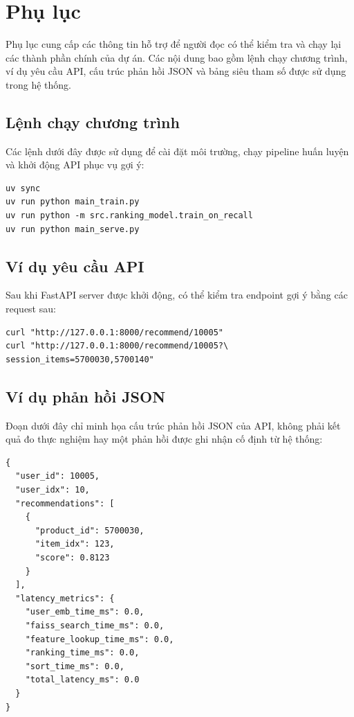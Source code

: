 \chapter{Phụ lục}

Phụ lục cung cấp các thông tin hỗ trợ để người đọc có thể kiểm tra và chạy lại các thành phần chính của dự án. Các nội dung bao gồm lệnh chạy chương trình, ví dụ yêu cầu API, cấu trúc phản hồi JSON và bảng siêu tham số được sử dụng trong hệ thống.

\section{Lệnh chạy chương trình}
Các lệnh dưới đây được sử dụng để cài đặt môi trường, chạy pipeline huấn luyện và khởi động API phục vụ gợi ý:

\begin{verbatim}
uv sync
uv run python main_train.py
uv run python -m src.ranking_model.train_on_recall
uv run python main_serve.py
\end{verbatim}

\section{Ví dụ yêu cầu API}
Sau khi FastAPI server được khởi động, có thể kiểm tra endpoint gợi ý bằng các request sau:

\begin{verbatim}
curl "http://127.0.0.1:8000/recommend/10005"
curl "http://127.0.0.1:8000/recommend/10005?\
session_items=5700030,5700140"
\end{verbatim}

\section{Ví dụ phản hồi JSON}
Đoạn dưới đây chỉ minh họa cấu trúc phản hồi JSON của API, không phải kết quả đo thực nghiệm hay một phản hồi được ghi nhận cố định từ hệ thống:

\begin{verbatim}
{
  "user_id": 10005,
  "user_idx": 10,
  "recommendations": [
    {
      "product_id": 5700030,
      "item_idx": 123,
      "score": 0.8123
    }
  ],
  "latency_metrics": {
    "user_emb_time_ms": 0.0,
    "faiss_search_time_ms": 0.0,
    "feature_lookup_time_ms": 0.0,
    "ranking_time_ms": 0.0,
    "sort_time_ms": 0.0,
    "total_latency_ms": 0.0
  }
}
\end{verbatim}

